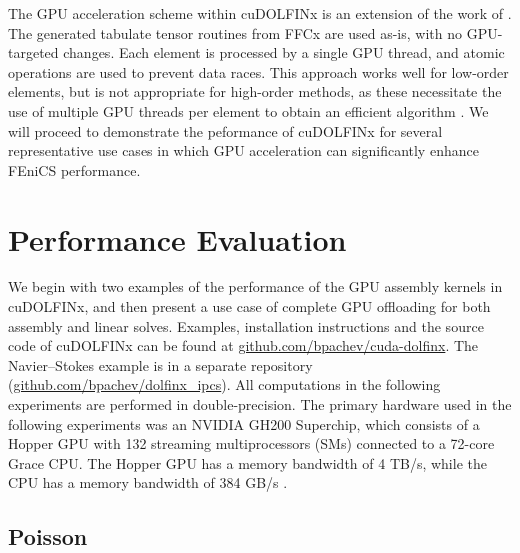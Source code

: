 The GPU acceleration scheme within cuDOLFINx is an extension of the work of \cite{trotter2023targeting}. The generated tabulate tensor routines from FFCx are used as-is, with no GPU-targeted changes. Each element is processed by a single GPU thread, and atomic operations are used to prevent data races. This approach works well for low-order elements, but is not appropriate for high-order methods, as these necessitate the use of multiple GPU threads per element to obtain an efficient algorithm \citep{MACIOL20101093,dziekonski2013generation,abdelfattah2021gpu, swirydowicz2019acceleration}. We will proceed to demonstrate the peformance of cuDOLFINx for several representative use cases in which GPU acceleration can significantly enhance FEniCS performance.

\section*{Performance Evaluation}

We begin with two examples of the performance of the GPU assembly kernels in cuDOLFINx, and then present a use case of complete GPU offloading for both assembly and linear solves. Examples, installation instructions and the source code of cuDOLFINx can be found at \href{https://github.com/bpachev/cuda-dolfinx}{github.com/bpachev/cuda-dolfinx}. The Navier--Stokes example is in a separate repository (\href{https://github.com/bpachev/dolfinx\_ipcs}{github.com/bpachev/dolfinx\_ipcs}). All computations in the following experiments are performed in double-precision. The primary hardware used in the following experiments was an NVIDIA GH200 Superchip, which consists of a Hopper GPU with 132 streaming multiprocessors (SMs) connected to a 72-core Grace CPU. The Hopper GPU has a memory bandwidth of 4 TB/s, while the CPU has a memory bandwidth of 384 GB/s \citep{gh200specs}. 

\subsection*{Poisson}


